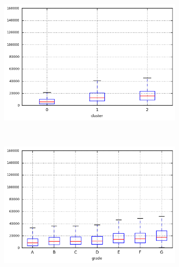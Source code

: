 \begin{anexosenv}
\begin{figure}[ht!]
\begin{subfigure}[t]{0.45\textwidth}
        \end{subfigure}
\end{figure}

\begin{figure}[t!]
    \centering
        \caption{\emph{Boxplots} de revol\textunderscore bal }
        \begin{subfigure}[t]{0.45\textwidth}
            \centering

            \centerline{\includegraphics[width=1\textwidth]{img/revol_bal_by_cluster}}
        \end{subfigure}%
        ~ 
        \begin{subfigure}[t]{0.45\textwidth}
            \centering
   
            \centerline{\includegraphics[width=1\textwidth]{img/revol_bal_by_grade}}


\end{subfigure}
\end{figure}
\end{anexosenv}
